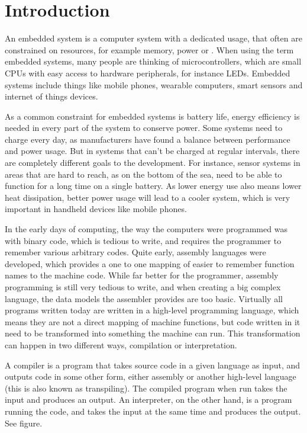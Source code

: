 \chapter{Introduction}
An embedded system is a computer system with a dedicated usage, that often are constrained on resources, for example memory, power or . When using the term embedded systems, many people are thinking of microcontrollers, which are small CPUs with easy access to hardware peripherals, for instance LEDs. Embedded systems include things like mobile phones, wearable computers, smart sensors and internet of things devices.

As a common constraint for embedded systems is battery life, energy efficiency is needed in every part of the system to conserve power. Some systems need to charge every day, as manufacturers have found a balance between performance and power usage. But in systems that can’t be charged at regular intervals, there are completely different goals to the development. For instance, sensor systems in areas that are hard to reach, as on the bottom of the sea, need to be able to function for a long time on a single battery. As lower energy use also means lower heat dissipation, better power usage will lead to a cooler system, which is very important in handheld devices like mobile phones. 

In the early days of computing, the way the computers were programmed was with binary code, which is tedious to write, and requires the programmer to remember various arbitrary codes. Quite early, assembly languages were developed, which provides a one to one mapping of easier to remember function names to the machine code. While far better for the programmer, assembly programming is still very tedious to write, and when creating a big complex language, the data models the assembler provides are too basic. Virtually all programs written today are written in a high-level programming language, which means they are not a direct mapping of machine functions, but code written in it need to be transformed into something the machine can run. This transformation can happen in two different ways, compilation or interpretation. 

A compiler is a program that takes source code in a given language as input, and outputs code in some other form, either assembly or another high-level language (this is also known as transpiling). The compiled program when run takes the input and produces an output. An interpreter, on the other hand, is a program running the code, and takes the input at the same time and produces the output. See figure.

